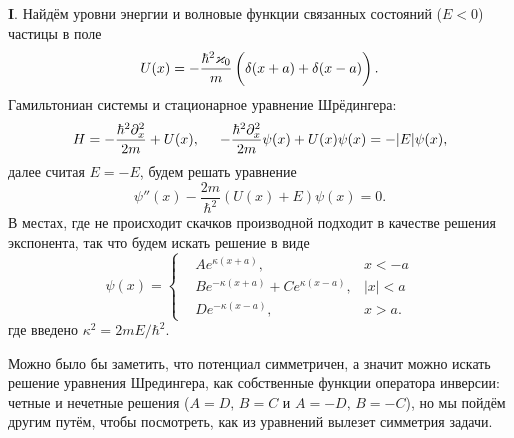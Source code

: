 

\textbf{I}. Найдём уровни энергии и волновые функции связанных состояний ($E<0$) частицы в поле
\begin{equation*}
    U(x) = - \frac{\hbar^2 \kappa_0}{m} \left( \bp
        \delta(x+a)+\delta(x-a)
    \right).
\end{equation*}
Гамильтониан системы и стационарное уравнение Шрёдингера:
\begin{equation*}
    H = - \frac{\hbar^2 \partial_x^2}{2m} + U(x),
    \hspace{5 mm}
    - \frac{\hbar^2 \partial_x^2}{2m} \psi(x) + U(x) \psi(x) = - |E| \psi(x),
\end{equation*}
далее считая $E = - E$, будем решать уравнение
\begin{equation*}
    \psi''(x) - \frac{2m}{\hbar^2} (U(x) + E) \psi(x) = 0.
\end{equation*}
В местах, где не происходит скачков производной подходит в качестве решения экспонента, так что будем искать решение в виде
\begin{equation*}
    \psi(x) = \left\{\begin{aligned}
        &A e^{\kappa (x+a)}, &x<-a \\
        &B e^{-\kappa(x+a)} + C e^{\kappa(x-a)}, &|x| < a \\
        &D e^{-\kappa (x-a)}, &x > a.
    \end{aligned}\right.
\end{equation*}
где введено $\kappa^2 = {2 m E}/{\hbar^2}$. 

Можно было бы заметить, что потенциал симметричен, а значит можно искать решение уравнения Шредингера, как собственные функции оператора инверсии: четные и нечетные решения ($A=D,\, B=C$ и $A=-D,\, B=-C$), но мы пойдём другим путём, чтобы посмотреть, как из уравнений вылезет симметрия задачи.


